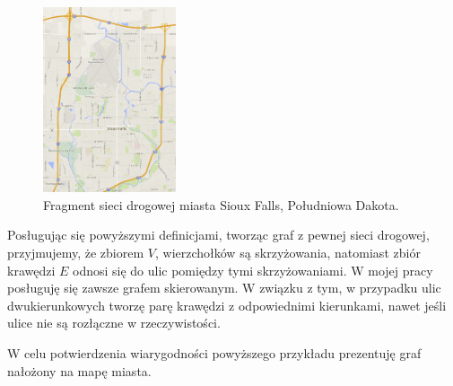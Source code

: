 \documentclass[twoside,12pt]{report}
\begin{document}
\begin{figure}[ht]
\begin{center}
\includegraphics[width=0.35\textwidth]{img/siec}
\caption{Fragment sieci drogowej miasta Sioux Falls, Południowa Dakota.} 
\end{center}
\end{figure}

Posługując się powyższymi definicjami, tworząc graf z pewnej sieci drogowej, przyjmujemy, że zbiorem $V$, wierzchołków są skrzyżowania, natomiast zbiór krawędzi $E$ odnosi się do ulic pomiędzy tymi skrzyżowaniami.
W mojej pracy posługuję się zawsze grafem skierowanym. W związku z tym, w przypadku ulic dwukierunkowych tworzę parę krawędzi z odpowiednimi kierunkami, nawet jeśli ulice nie są rozłączne w rzeczywistości.

W celu potwierdzenia wiarygodności powyższego przykładu prezentuję graf nałożony na mapę miasta.
\end{document}

